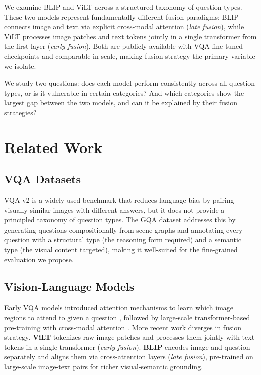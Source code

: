\documentclass[11pt]{article}
\begin{document}
We examine BLIP \cite{li2022blip} and ViLT \cite{kim2021vilt} across a structured taxonomy of question types. These two models represent fundamentally different fusion paradigms: BLIP connects image and text via explicit cross-modal attention (\emph{late fusion}), while ViLT processes image patches and text tokens jointly in a single transformer from the first layer (\emph{early fusion}). Both are publicly available with VQA-fine-tuned checkpoints and comparable in scale, making fusion strategy the primary variable we isolate.

We study two questions: does each model perform consistently across all question types, or is it vulnerable in certain categories? And which categories show the largest gap between the two models, and can it be explained by their fusion strategies?

\section{Related Work}

\subsection{VQA Datasets}

VQA v2 \cite{goyal2017making} is a widely used benchmark that reduces language bias by pairing visually similar images with different answers, but it does not provide a principled taxonomy of question types. The GQA dataset \cite{hudson2019gqa} addresses this by generating questions compositionally from scene graphs and annotating every question with a structural type (the reasoning form required) and a semantic type (the visual content targeted), making it well-suited for the fine-grained evaluation we propose.

\subsection{Vision-Language Models}
Early VQA models introduced attention mechanisms to learn which image regions to attend to given a question \cite{anderson2018bottom, yang2016stacked}, followed by large-scale transformer-based pre-training with cross-modal attention \cite{lu2019vilbert, chen2020uniter}. More recent work diverges in fusion strategy. \textbf{ViLT} \cite{kim2021vilt} tokenizes raw image patches and processes them jointly with text tokens in a single transformer (\textit{early fusion}). \textbf{BLIP} \cite{li2022blip} encodes image and question separately and aligns them via cross-attention layers (\textit{late fusion}), pre-trained on large-scale image-text pairs for richer visual-semantic grounding.
\end{document}
